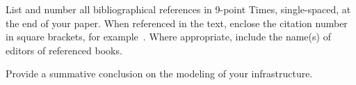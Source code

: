 \documentclass[times, 10pt,twocolumn]{article}
\begin{document}

List and number all bibliographical references in 9-point Times,
single-spaced, at the end of your paper. When referenced in the text,
enclose the citation number in square brackets, for example~\cite{ex1}.
Where appropriate, include the name(s) of editors of referenced books.






Provide a summative conclusion on the modeling of your infrastructure.

\nocite{ex1,ex2}


\end{document}
